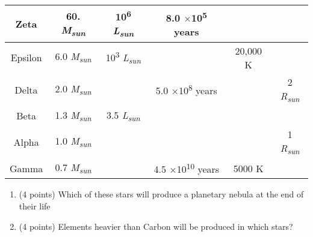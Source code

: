 \documentclass[12pt]{article}
\begin{document}
\begin{enumerate}
\begin{tabular}{ |c|c|c|c|c|c| }
 Zeta & 60. \textit{M\textsubscript{sun}} & 10\textsuperscript{6} \textit{L\textsubscript{sun}} & 8.0 $\times$10\textsuperscript{5} years &  &  \\ \hline
 Epsilon & 6.0 \textit{M\textsubscript{sun}} & 10\textsuperscript{3} \textit{L\textsubscript{sun}} &  & 20,000 K &  \\ \hline
 Delta & 2.0 \textit{M\textsubscript{sun}} &  & 5.0 $\times$10\textsuperscript{8} years &  & 2 \textit{R\textsubscript{sun}}\\ \hline
 Beta & 1.3 \textit{M\textsubscript{sun}} & 3.5  \textit{L\textsubscript{sun}} &  &  &  \\ \hline
 Alpha & 1.0 \textit{M\textsubscript{sun}} &  &  &  & 1 \textit{R\textsubscript{sun}} \\ \hline
 Gamma & 0.7 \textit{M\textsubscript{sun}} &  & 4.5 $\times$10\textsuperscript{10} years & 5000 K &  \\ \hline
\end{tabular}
\vskip 0.2in
\begin{enumerate}
    \item (4 points) Which of these stars will produce a planetary nebula at the end of their life
    \vskip 0.5in
    \item (4 points) Elements heavier than Carbon will be produced in which stars?
\end{enumerate}
\end{enumerate}
\end{document}
